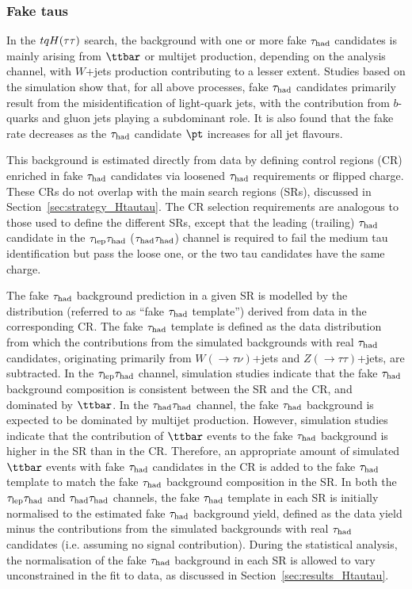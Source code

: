 \subsubsection{Fake taus}
\label{sec:faketaus}
In the $tqH(\tau\tau)$ search, the background with one or more fake $\tau_{\mathrm{had}}$ candidates is mainly arising from $\ttbar$ or
multijet production, depending on the analysis channel, with $W$+jets production contributing to a lesser extent. 
Studies based on the simulation show that, for all above processes, fake $\tau_{\mathrm{had}}$ candidates primarily result from the 
misidentification of light-quark jets, with the contribution from $b$-quarks and gluon jets playing a subdominant role.
It is also found that the fake rate decreases as the $\tau_{\mathrm{had}}$ candidate $\pt$ increases for all jet flavours.

This background is estimated directly from data by defining control regions (CR) enriched in fake $\tau_{\mathrm{had}}$ candidates via loosened $\tau_{\mathrm{had}}$ requirements or flipped charge. These CRs do not overlap with the main search regions (SRs), discussed in Section~\ref{sec:strategy_Htautau}. The CR selection requirements are analogous to those used to define the different SRs, except that the leading (trailing) $\tau_{\mathrm{had}}$ candidate 
in the $\tau_{\mathrm{lep}} \tau_{\mathrm{had}}$ ($\tau_{\mathrm{had}} \tau_{\mathrm{had}}$) channel is required to fail the medium tau identification but pass the loose one, or the two tau candidates have the same charge.

The fake $\tau_{\mathrm{had}}$ background prediction in a given SR is modelled by the distribution (referred to as ``fake $\tau_{\mathrm{had}}$ template'') derived from data in the corresponding CR. The fake $\tau_{\mathrm{had}}$ template is defined as the data distribution from which the contributions from the simulated backgrounds with real $\tau_{\mathrm{had}}$ candidates, originating primarily from 
$W(\to \tau\nu)$+jets and $Z(\to \tau\tau)$+jets, are subtracted. In the $\tau_{\mathrm{lep}} \tau_{\mathrm{had}}$ channel, simulation studies indicate that the fake $\tau_{\mathrm{had}}$ background composition is consistent between the SR and the CR, and dominated by $\ttbar$. In the $\tau_{\mathrm{had}} \tau_{\mathrm{had}}$ channel, the fake $\tau_{\mathrm{had}}$ background is expected to be dominated by multijet production. However, simulation studies indicate that the contribution of $\ttbar$ events to the fake $\tau_{\mathrm{had}}$ background is higher in the SR than in the CR. Therefore, an appropriate amount of simulated $\ttbar$ events with fake $\tau_{\mathrm{had}}$ candidates in the CR is added to the fake $\tau_{\mathrm{had}}$ template to match the fake $\tau_{\mathrm{had}}$ background composition in the SR. 
In both the $\tau_{\mathrm{lep}} \tau_{\mathrm{had}}$ and $\tau_{\mathrm{had}} \tau_{\mathrm{had}}$ channels, the fake $\tau_{\mathrm{had}}$ template in each SR is initially normalised to the estimated fake $\tau_{\mathrm{had}}$ background yield, 
defined as the data yield minus the contributions from the simulated backgrounds with real $\tau_{\mathrm{had}}$ candidates (i.e. assuming no signal contribution).
During the statistical analysis, the normalisation of the fake $\tau_{\mathrm{had}}$ background in each SR is allowed to vary unconstrained in the fit to data, as discussed in Section~\ref{sec:results_Htautau}.

